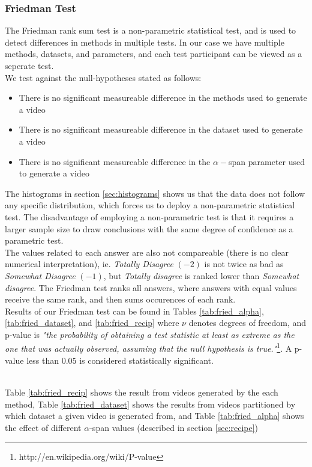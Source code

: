 \subsubsection{Friedman Test}\label{sec:friedman}
%
The Friedman rank sum test
 is a non-parametric statistical test, and is used to detect differences in methods in multiple tests. In our case we have multiple methods, datasets, and parameters, and each test participant can be viewed as a seperate test.\\
 We test against the null-hypotheses stated as follows: 
 \begin{itemize}
 \item There is no significant measureable difference in the methods used to generate a video
 \item There is no significant measureable difference in the dataset used to generate a video
 \item There is no significant measureable difference in the $\alpha-$span parameter used to generate a video
 \end{itemize}
%
The histograms in section \ref{sec:histograms} shows us that the data does not follow any specific distribution, which forces us to deploy a non-parametric statistical test. The disadvantage of employing a non-parametric test is that it requires a larger sample size to draw conclusions with the same degree of confidence as a parametric test.\\
%
The values related to each answer are also not compareable (there is no clear numerical interpretation), ie. \textit{Totally Disagree} $(-2)$ is not twice as bad as \textit{Somewhat Disagree} $(-1)$, but \textit{Totally disagree} is ranked lower than \textit{Somewhat disagree}. The Friedman test ranks all answers, where answers with equal values receive the same rank, and then sums occurences of each rank.\\
%
Results of our Friedman test can be found in Tables \ref{tab:fried_alpha}, \ref{tab:fried_dataset}, and \ref{tab:fried_recip} where $\nu$ denotes degrees of freedom, and p-value is \textit{"the probability of obtaining a test statistic at least as extreme as the one that was actually observed, assuming that the null hypothesis is true."}\footnote{http://en.wikipedia.org/wiki/P-value}. A p-value less than $0.05$ is considered statistically significant.



%
\\ %
Table \ref{tab:fried_recip} shows the result from videos generated by the each method, Table \ref{tab:fried_dataset} shows the results from videos partitioned by which dataset a given video is generated from, and Table \ref{tab:fried_alpha} shows the effect of different $\alpha$-span values (described in section \ref{sec:recipe})
%
